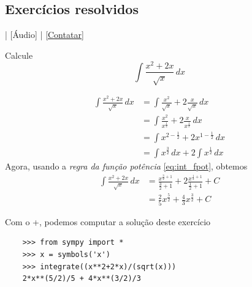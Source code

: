 \subsection*{Exercícios resolvidos}

\begin{flushright}
  [Vídeo] | [Áudio] | \href{https://phkonzen.github.io/notas/contato.html}{[Contatar]}
\end{flushright}

\begin{exeresol}
  Calcule
  \begin{equation}
    \int \frac{x^2+2x}{\sqrt{x}}\,dx
  \end{equation}
\end{exeresol}
\begin{resol}
  \begin{align}
    \int \frac{x^2+2x}{\sqrt{x}}\,dx &= \int \frac{x^2}{\sqrt{x}} + 2\frac{x}{\sqrt{x}}\,dx\\
                                     &= \int \frac{x^2}{x^{\frac{1}{2}}} + 2\frac{x}{x^{\frac{1}{2}}}\,dx\\
                                     &= \int x^{2-\frac{1}{2}} + 2x^{1-\frac{1}{2}}\,dx\\
                                     &= \int x^{\frac{3}{2}}\,dx + 2\int x^{\frac{1}{2}}\,dx
  \end{align}
  Agora, usando a \emph{regra da função potência} \eqref{eq:int_fpot}, obtemos
  \begin{align}
    \int \frac{x^2+2x}{\sqrt{x}}\,dx &= \frac{x^{\frac{3}{2}+1}}{\frac{3}{2}+1} + 2\frac{x^{\frac{1}{2}+1}}{\frac{1}{2}+1} + C\\
                                     &= \frac{2}{5}x^{\frac{5}{2}} + \frac{4}{3}x^{\frac{3}{2}} + C
  \end{align}

  \ifispython
  Com o {\python}+{\sympy}, podemos computar a solução deste exercício
  \begin{lstlisting}
    >>> from sympy import *
    >>> x = symbols('x')
    >>> integrate((x**2+2*x)/(sqrt(x)))
    2*x**(5/2)/5 + 4*x**(3/2)/3
  \end{lstlisting}
  \fi
\end{resol}

